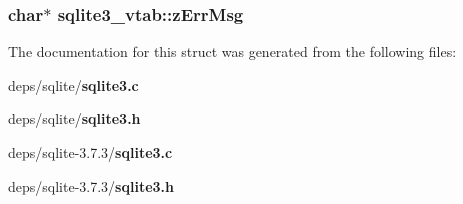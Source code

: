 \subsubsection{\setlength{\rightskip}{0pt plus 5cm}char$\ast$ \bf{sqlite3\_\-vtab::z\-Err\-Msg}}\label{structsqlite3__vtab_da75e92314979a8c9a48c73c95f6c8cc}




The documentation for this struct was generated from the following files:\begin{CompactItemize}
\item 
deps/sqlite/\bf{sqlite3.c}\item 
deps/sqlite/\bf{sqlite3.h}\item 
deps/sqlite-3.7.3/\bf{sqlite3.c}\item 
deps/sqlite-3.7.3/\bf{sqlite3.h}\end{CompactItemize}
